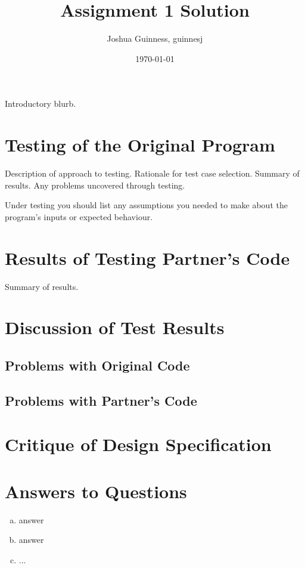 \documentclass[12pt]{article}
\title{Assignment 1 Solution}
\author{Joshua Guinness, guinnesj}
\date{\today}
\begin{document}
\maketitle

Introductory blurb.

\section{Testing of the Original Program}

Description of approach to testing.  Rationale for test case selection.  Summary
of results.  Any problems uncovered through testing.

Under testing you should list any assumptions you needed to make about the
program's inputs or expected behaviour.

\section{Results of Testing Partner's Code}

Summary of results.

\section{Discussion of Test Results}

\subsection{Problems with Original Code}

\subsection{Problems with Partner's Code}

\section{Critique of Design Specification}


\section{Answers to Questions}

\begin{enumerate}[(a)]

\item answer

\item answer

\item ...

\end{enumerate}
\end{document}
